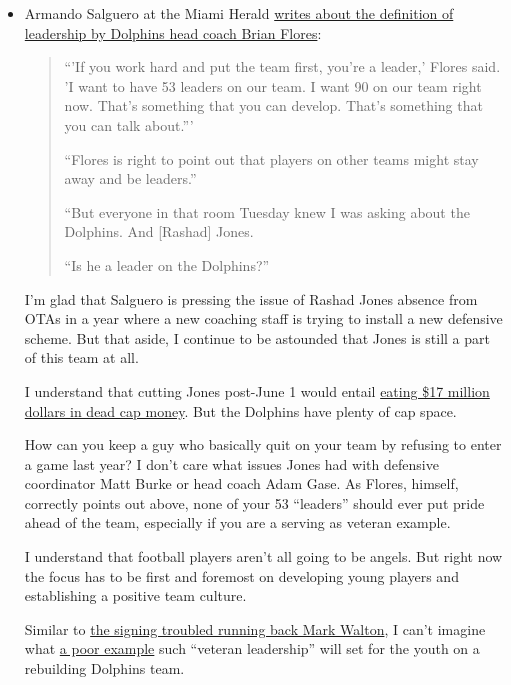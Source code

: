 \documentclass[11pt]{article}
\author{Tom Shannon}
\date{\today}
\title{}
\begin{document}
\begin{itemize}
\item Armando Salguero at the Miami Herald \href{https://www.miamiherald.com/sports/spt-columns-blogs/armando-salguero/article230422099.html}{writes about the definition of leadership by Dolphins head coach Brian Flores}: 

\begin{quote}
``'If you work hard and put the team first, you’re a leader,' Flores said. 'I want to have 53 leaders on our team. I want 90 on our team right now. That’s something that you can develop. That’s something that you can talk about.'''

``Flores is right to point out that players on other teams might stay away and be leaders.''

``But everyone in that room Tuesday knew I was asking about the Dolphins. And [Rashad] Jones.

``Is he a leader on the Dolphins?''
\end{quote}

I'm glad that Salguero is pressing the issue of Rashad Jones absence from OTAs in a year where a new coaching staff is trying to install a new defensive scheme.  But that aside, I continue to be astounded that Jones is still a part of this team at all.

I understand that cutting Jones post-June 1 would entail \href{https://overthecap.com/salary-cap/miami-dolphins/}{eating \$17 million dollars in dead cap money}.  But the Dolphins have plenty of cap space.

How can you keep a guy who basically quit on your team by refusing to enter a game last year?  I don't care what issues Jones had with defensive coordinator Matt Burke or head coach Adam Gase.  As Flores, himself, correctly points out above, none of your 53 ``leaders'' should ever put pride ahead of the team, especially if you are a serving as veteran example.

I understand that football players aren't all going to be angels.  But right now the focus has to be first and foremost on developing young players and establishing a positive team culture.

Similar to \href{https://www.phinmaniacs.com/news/running-back-mark-walton-gets-second-chance-with-miami-dolphins}{the signing troubled running back Mark Walton}, I can't imagine what \href{https://www.phinmaniacs.com/news/points-of-view-from-a-dolphins-perspective}{a poor example} such ``veteran leadership'' will set for the youth on a rebuilding Dolphins team.


\end{itemize}
\end{document}
